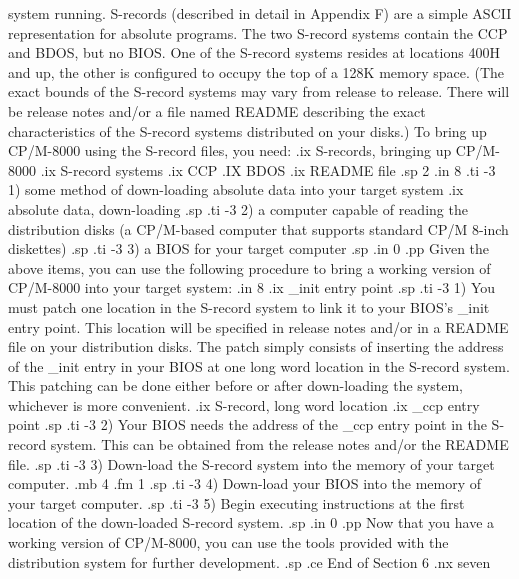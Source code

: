 system running.  S-records (described in detail in Appendix F) are a simple 
ASCII representation for absolute programs.  The two S-record 
systems contain the CCP and BDOS, but no BIOS.  One of the S-record systems
resides at locations 400H and up, the other is configured to occupy the top
of a 128K memory space.  (The exact bounds of the S-record systems may vary
from release to release.  There will be release notes and/or a file named 
README describing the exact characteristics of the S-record systems 
distributed on your disks.)  To bring up CP/M-8000 using the S-record files, 
you need:
.ix S-records, bringing up CP/M-8000
.ix S-record systems
.ix CCP
.IX BDOS 
.ix README file
.sp 2
.in 8
.ti -3
1) some method of down-loading absolute data into your target system
.ix absolute data, down-loading
.sp
.ti -3
2) a computer capable of reading the distribution disks (a CP/M-based
computer that supports standard CP/M 8-inch diskettes)
.sp
.ti -3
3) a BIOS for your target computer
.sp
.in 0 
.pp
Given the above items, you can use the following procedure to bring a working
version of CP/M-8000 into your target system:
.in 8
.ix _init entry point
.sp
.ti -3
1) You must patch one location in the S-record system to link it to your BIOS's
_init entry point.  This location will be specified in release notes and/or
in a README file on your distribution disks.  The patch simply consists of 
inserting the address of the _init entry in your BIOS at one long word
location in the S-record system.  This patching can be done either before
or after down-loading the system, whichever is more convenient. 
.ix S-record, long word location 
.ix _ccp entry point
.sp
.ti -3
2) Your BIOS needs the address of the _ccp entry point in the S-record 
system.  This can be obtained from the release notes and/or the README file.
.sp
.ti -3
3) Down-load the S-record system into the memory of your target computer.
.mb 4
.fm 1
.sp
.ti -3
4) Down-load your BIOS into the memory of your target computer.
.sp
.ti -3
5) Begin executing instructions at the first location of the down-loaded
S-record system.
.sp
.in 0
.pp
Now that you have a working version of CP/M-8000, you can use the tools 
provided with the distribution system for further development.
.sp
.ce
End of Section 6
.nx seven




